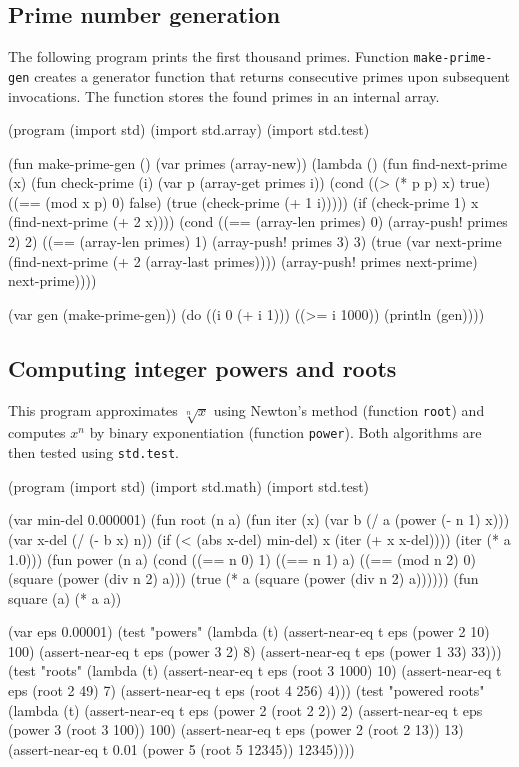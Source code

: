 \subsection{Prime number generation}

The following program prints the first thousand primes. Function
\texttt{make-prime-gen} creates a generator function that returns consecutive
primes upon subsequent invocations. The function stores the found primes in an
internal array.

\begin{spiral}
(program
  (import std)
  (import std.array)
  (import std.test)

  (fun make-prime-gen ()
    (var primes (array-new))
    (lambda ()
      (fun find-next-prime (x)
        (fun check-prime (i)
          (var p (array-get primes i))
          (cond
            ((> (* p p) x) true)
            ((== (mod x p) 0) false)
            (true (check-prime (+ 1 i)))))
        (if (check-prime 1) x (find-next-prime (+ 2 x))))
      (cond
        ((== (array-len primes) 0)
          (array-push! primes 2) 2)
        ((== (array-len primes) 1)
          (array-push! primes 3) 3)
        (true 
          (var next-prime (find-next-prime (+ 2 (array-last primes))))
          (array-push! primes next-prime)
          next-prime))))

  (var gen (make-prime-gen))
  (do ((i 0 (+ i 1)))
    ((>= i 1000))
    (println (gen))))
\end{spiral}

\subsection{Computing integer powers and roots}

This program approximates $\sqrt[n]{x}$ using Newton's method (function
\texttt{root}) and computes $x^n$ by binary exponentiation (function
\texttt{power}). Both algorithms are then tested using \texttt{std.test}.

\begin{spiral}
(program
  (import std)
  (import std.math)
  (import std.test)

  (var min-del 0.000001)
  (fun root (n a)
    (fun iter (x)
      (var b (/ a (power (- n 1) x)))
      (var x-del (/ (- b x) n))
      (if (< (abs x-del) min-del) x (iter (+ x x-del))))
    (iter (* a 1.0)))
  (fun power (n a)
    (cond
      ((== n 0) 1)
      ((== n 1) a)
      ((== (mod n 2) 0) (square (power (div n 2) a)))
      (true (* a (square (power (div n 2) a))))))
  (fun square (a) (* a a))

  (var eps 0.00001)
  (test "powers" (lambda (t) 
    (assert-near-eq t eps (power 2 10) 100)
    (assert-near-eq t eps (power 3 2) 8)
    (assert-near-eq t eps (power 1 33) 33)))
  (test "roots" (lambda (t)
    (assert-near-eq t eps (root 3 1000) 10)
    (assert-near-eq t eps (root 2 49) 7)
    (assert-near-eq t eps (root 4 256) 4)))
  (test "powered roots" (lambda (t)
    (assert-near-eq t eps (power 2 (root 2 2)) 2)
    (assert-near-eq t eps (power 3 (root 3 100)) 100)
    (assert-near-eq t eps (power 2 (root 2 13)) 13)
    (assert-near-eq t 0.01 (power 5 (root 5 12345)) 12345))))
\end{spiral}
